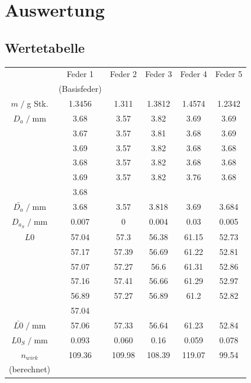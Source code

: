 \section{Auswertung}
\subsection{Wertetabelle}
\begin{table}[H]
    \centering
    \begin{tabular}{c | c c c c c}
        \toprule
        & Feder 1 & Feder 2 & Feder 3 & Feder 4 & Feder 5 \\ & (Basisfeder)\\
        \midrule
        $m\;/\;$g Stk. & 1.3456 & 1.311 & 1.3812 & 1.4574 & 1.2342 \\
        \midrule
        $D_a\;/\;$mm & 3.68 & 3.57 & 3.82 & 3.69 & 3.69 \\
          & 3.67 & 3.57 & 3.81 & 3.68 & 3.69 \\
          & 3.69 & 3.57 & 3.82 & 3.68 & 3.68 \\
          & 3.68 & 3.57 & 3.82 & 3.68 & 3.68 \\
          & 3.69 & 3.57 & 3.82 & 3.76 & 3.68 \\
          & 3.68 &         &         &         &         \\
        \midrule
        $\bar{D_a}\;/\;$mm & 3.68  & 3.57 & 3.818 & 3.69 & 3.684\\
        $D_{a_S}\;/\;$mm& 0.007 & 0 & 0.004 & 0.03 & 0.005\\
        \midrule
        $L0$ 	& 57.04 	& 57.3 		& 56.38 	& 61.15 	& 52.73 	\\
                & 57.17 	& 57.39 	& 56.69 	& 61.22 	& 52.81 	\\
                & 57.07 	& 57.27 	& 56.6 		& 61.31 	& 52.86 	\\
                & 57.16 	& 57.41 	& 56.66 	& 61.29 	& 52.97 	\\
                & 56.89 	& 57.27 	& 56.89 	& 61.2 		& 52.82 	\\
                & 57.04 	&         	&         	&         	&   \\
        \midrule
        $\bar{L0}\;/\;$mm & 57.06 	& 57.33 	& 56.64 	& 61.23 	& 52.84	\\
        $L0{_S}\;/\;$mm & 0.093 	& 0.060 	& 0.16 	& 0.059 	& 0.078	\\
        $n_{wirk}$ & 109.36 & 109.98 & 108.39 & 119.07 & 99.54 \\(berechnet)\\

\end{tabular}
\end{table}
